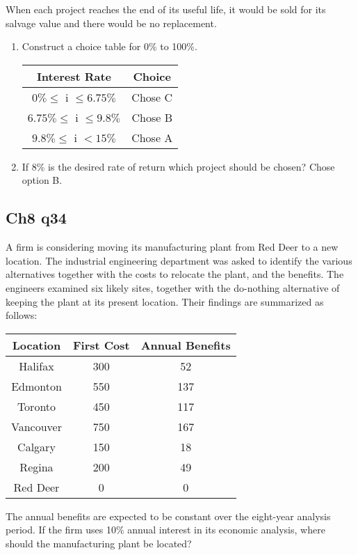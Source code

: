 \documentclass[12pt]{article}
\begin{document}
When each project reaches the end of its useful life, it would be sold for its salvage value and there would be no replacement.
\begin{enumerate}
    \item Construct a choice table for 0\% to 100\%.
        \begin{center}
            \begin{tabular}{c c }
                \textbf{Interest Rate} & \textbf{Choice}\\
                \hline
                $0\%\leq$ i $\leq 6.75\%$ & Chose C\\
                $6.75\%\leq$ i $\leq 9.8\%$ & Chose B\\
                $9.8\%\leq$ i $<15\%$ & Chose A\\
                \hline
            \end{tabular}
        \end{center}
    \item If 8\% is the desired rate of return which project should be chosen?
        Chose option B.
\end{enumerate}

\subsection*{Ch8 q34}
A firm is considering moving its manufacturing plant from Red Deer to a new location. The industrial engineering department was asked to identify the various alternatives together with the costs to relocate the plant, and the benefits. The engineers examined six likely sites, together with the do-nothing alternative of keeping the plant at its present location. Their findings are summarized as follows:
\begin{center}
    \begin{tabular}{c c c}
    \textbf{Location} & \textbf{First Cost} & \textbf{Annual Benefits}\\
    \hline
    Halifax & 300 & 52\\
    Edmonton & 550 & 137\\
    Toronto & 450 & 117\\
    Vancouver & 750 & 167\\
    Calgary & 150 & 18\\
    Regina & 200 & 49\\
    Red Deer & 0 & 0\\
    \end{tabular}
\end{center}
The annual benefits are expected to be constant over the eight-year analysis period. If the firm uses 10\% annual interest in its economic analysis, where should the manufacturing plant be located?
\end{document}
